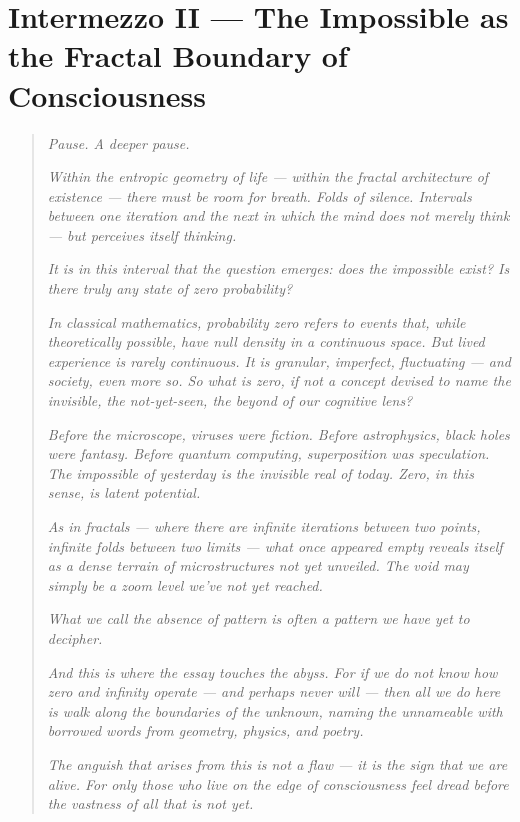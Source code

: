 \section*{Intermezzo II — The Impossible as the Fractal Boundary of Consciousness}

\begin{quote}
\textit{Pause. A deeper pause.}

\textit{Within the entropic geometry of life — within the fractal architecture of existence — there must be room for breath. Folds of silence. Intervals between one iteration and the next in which the mind does not merely think — but perceives itself thinking.}

\textit{It is in this interval that the question emerges: does the impossible exist? Is there truly any state of zero probability?}

\textit{In classical mathematics, probability zero refers to events that, while theoretically possible, have null density in a continuous space. But lived experience is rarely continuous. It is granular, imperfect, fluctuating — and society, even more so. So what is zero, if not a concept devised to name the invisible, the not-yet-seen, the beyond of our cognitive lens?}

\textit{Before the microscope, viruses were fiction. Before astrophysics, black holes were fantasy. Before quantum computing, superposition was speculation. The impossible of yesterday is the invisible real of today. Zero, in this sense, is latent potential.}

\textit{As in fractals — where there are infinite iterations between two points, infinite folds between two limits — what once appeared empty reveals itself as a dense terrain of microstructures not yet unveiled. The void may simply be a zoom level we’ve not yet reached.}

\textit{What we call the absence of pattern is often a pattern we have yet to decipher.}

\textit{And this is where the essay touches the abyss. For if we do not know how zero and infinity operate — and perhaps never will — then all we do here is walk along the boundaries of the unknown, naming the unnameable with borrowed words from geometry, physics, and poetry.}

\textit{The anguish that arises from this is not a flaw — it is the sign that we are alive. For only those who live on the edge of consciousness feel dread before the vastness of all that is not yet.}
\end{quote}